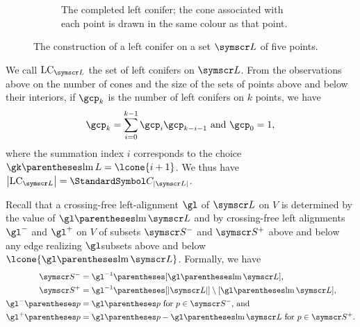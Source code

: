\begin{figure}[ht!]
\begin{subfigure}{.45\textwidth}
  \caption{The completed left conifer; the cone associated with each point is drawn in the same colour
  as that point.}
\end{subfigure}
\caption{The construction of a left conifer on a set $\pointset L$ of five points.}
\label{figLeftConifer}
\end{figure}

We call $\LC {\pointset L}$ the set of left conifers on $\pointset L$. From the observations above on the number
of cones and the
size of the sets of points above and below their interiors, if $\gcp_k$ is the number of left conifers on $k$ points,
we have
\[
\gcp_k=\sum{i=0}[k-1]\gcp_{i}\gcp_{k-i-1} \text{ and } \gcp_0=1\text,
\]
where the summation index $i$ corresponds to the choice $\gk\of{\leftmost L}=\lcone {i+1}$.
We thus have $\Cardinality{\LC {\pointset L}} = \CatalanNumber {\Cardinality{\pointset L}}$.

Recall that a crossing-free left-alignment $\gl$ of $\pointset L$ on $V$
is determined by the value of $\gl\of{\leftmost\pointset L}$ and by
crossing-free left alignments $\gl^-$ and $\gl^+$ on $V$
of subsets $\pointset S^-$ and $\pointset S^+$ above and below any edge
realizing $\gl$\idest subsets above and below $\lcone{\gl\of{\leftmost\pointset L}}$.
Formally, we have
\begin{align*}
\pointset S^- &= \gl^{-1}\of{[\gl\of{\leftmost\pointset L}]}\text,\\
\pointset S^+ &= \gl^{-1}\of{[\Cardinality{\pointset L}]\setminus[\gl\of{\leftmost\pointset L}]}\text,\\
\gl^-\of{p} &= \gl\of{p} \text{ for $p\in\pointset S^-$, and}\\
\gl^+\of{p} &= \gl\of{p}-\gl\of{\leftmost\pointset L} \text{ for $p\in\pointset S^+$.}
\end{align*}

